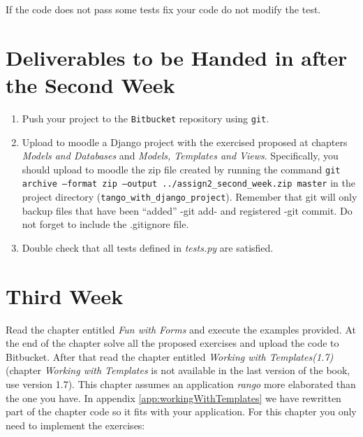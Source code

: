 \documentclass[12pt]{article} %
\newcounter{ejercicioNo}
\begin{document}
If the code does not pass some tests fix your code do not modify the test.

\section{Deliverables to be Handed in after the Second Week}

\begin{minipage}{\linewidth}
\begin{framed}
\begin{enumerate}
\item Push your project to the \texttt{Bitbucket} repository using \texttt{git}. 

\item Upload to moodle a Django project with the exercised proposed at chapters \textit{Models and Databases} and  \textit{Models, Templates and Views}. Specifically, you should upload to moodle the  zip file created by running the command \texttt{git archive --format zip --output ../assign2\_second\_week.zip  master} in the project directory (\texttt{tango\_with\_django\_project}). Remember that git will only backup files that have been ``added'' -git add- and registered -git commit. Do not forget to include the .gitignore file.

\item Double check that all tests defined in \textit{tests.py} are satisfied.
\end{enumerate}
\end{framed}
\end{minipage}

\section{Third Week}

Read the chapter entitled \textit{Fun with Forms} and execute the examples provided. At the end of the chapter solve all the proposed exercises and upload the code to Bitbucket. After that read the chapter entitled \textit{Working with Templates(1.7)} (chapter \textit{Working with Templates} is not available in the last version of the book, use version  1.7). This chapter assumes an application  \textit{rango} more elaborated than the one you have. In  appendix \ref{app:workingWithTemplates} we have rewritten part of the chapter code so it fits with your application. For this chapter you only need to implement the exercises:
\end{document}
